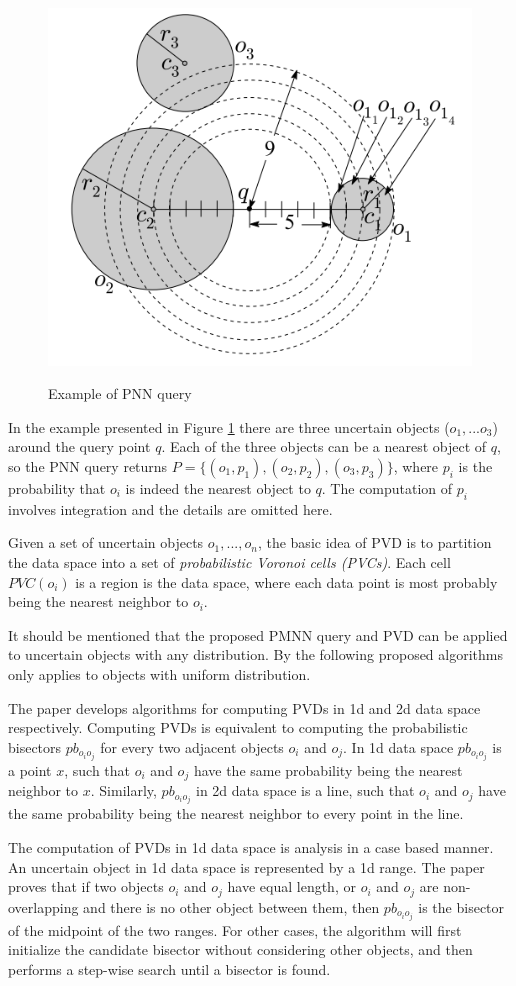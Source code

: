 \documentclass[paper=a4, fontsize=18pt]{article} %
\numberwithin{equation}{section} %
\numberwithin{figure}{section} %
\numberwithin{table}{section} %
\begin{document}
\begin{figure}[h]
  \centering
  \includegraphics[width=.5\linewidth]{7_11_pnn_example.png}\\
  \caption{Example of PNN query}\label{fig:PNN_example}
\end{figure}

In the example presented in Figure \ref{fig:PNN_example} there are three uncertain objects ($o_1, ... o_3$) around the query point $q$. Each of the three objects can be a nearest object of $q$, so the PNN query returns $P = \{(o_1,p_1),(o_2,p_2),(o_3,p_3)\}$, where $p_i$ is the probability that $o_i$ is indeed the nearest object to $q$. The computation of $p_i$ involves integration and the details are omitted here.

Given a set of uncertain objects $o_1,..., o_n$, the basic idea of PVD is to partition the data space into a set of \emph{probabilistic Voronoi cells (PVCs)}. Each cell $PVC(o_i)$ is a region is the data space, where each data point is most probably being the nearest neighbor to $o_i$.

It should be mentioned that the proposed PMNN query and PVD can be applied to uncertain objects with any distribution. By the following proposed algorithms only applies to objects with uniform distribution.

The paper develops algorithms for computing PVDs in 1d and 2d data space respectively. Computing PVDs is equivalent to computing the probabilistic bisectors $pb_{o_io_j}$ for every two adjacent objects $o_i$ and $o_j$. In 1d data space $pb_{o_io_j}$ is a point $x$, such that $o_i$ and $o_j$ have the same probability being the nearest neighbor to $x$. Similarly, $pb_{o_io_j}$ in 2d data space is a line, such that $o_i$ and $o_j$ have the same probability being the nearest neighbor to every point in the line.

The computation of PVDs in 1d data space is analysis in a case based manner. An uncertain object in 1d data space is represented by a 1d range. The paper proves that if two objects $o_i$ and $o_j$ have equal length, or $o_i$ and $o_j$ are non-overlapping and there is no other object between them, then $pb_{o_io_j}$ is the bisector of the midpoint of the two ranges. For other cases, the algorithm will first initialize the candidate bisector without considering other objects, and then performs a step-wise search until a bisector is found.
\end{document}
